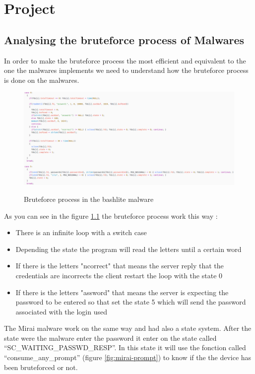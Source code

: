 \documentclass{report}
\begin{document}
\chapter{Project}
\section{Analysing the bruteforce process of Malwares}
In order to make the bruteforce process the most efficient and equivalent to the one the malwares implements we need to understand how the bruteforce process is done on the malwares.
\begin{figure}
 \caption{Bruteforce process in the bashlite malware}
 \includegraphics[width=1.2\textwidth]{./img/bashlite-bruteforce}
 \label{fig:bashlite-brute}
\end{figure}
As you can see in the figure \ref{fig:bashlite-brute} the bruteforce process work this way :
\begin{itemize}
\item There is an infinite loop with a switch case

\item Depending the state the program will read the letters until a certain word

\item If there is the letters "ncorrect" that means the server reply that the credentials are incorrects the client restart the loop with the state 0

\item If there is the letters "assword" that means the server is expecting the password to be entered so that set the state 5 which will send the password associated with the login used
\end{itemize}

The Mirai malware work on the same way and had also a state system. After the state were the malware enter the password it enter on the state called ``SC\_WAITING\_PASSWD\_RESP''. In this state it will use the fonction called ``consume\_any\_prompt'' (figure \ref{fig:mirai-prompt}) to know if the the device has been bruteforced or not.
\end{document}
